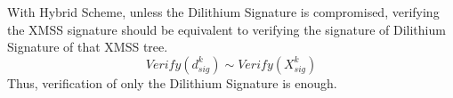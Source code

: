 \documentclass[lettersize,journal]{IEEEtran}
\begin{document}
With Hybrid Scheme, unless the Dilithium Signature is compromised, 
verifying the XMSS signature should be equivalent to verifying the signature of Dilithium Signature of that
XMSS tree.
$$Verify(d_{sig}^k) \sim Verify(X_{sig}^k)$$
Thus, verification of only the Dilithium Signature is enough.







\end{document}
